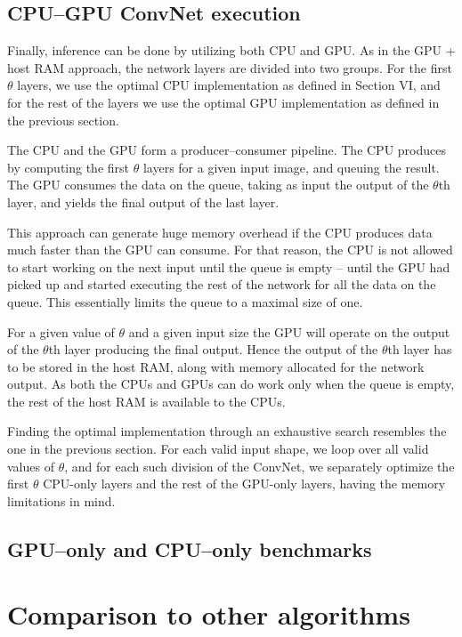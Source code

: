 \documentclass[conference]{./IEEEtran/IEEEtran}
\begin{document}
\subsection{CPU--GPU ConvNet execution}
Finally, inference can be done by utilizing both CPU and GPU.  As in
the GPU + host RAM approach, the network
  layers are divided into two groups.  For the first $\theta$
  layers, we use the optimal CPU implementation as defined in Section
  VI, and for the rest of the layers we use the optimal GPU
  implementation as defined in the previous section.

  The CPU and the GPU form a producer--consumer pipeline.  The CPU
  produces by computing the first $\theta$ layers for a given input
  image, and queuing the result.  The GPU consumes the data on the
  queue, taking as input the output of the $\theta$th layer, and
  yields the final output of the last layer.

  This approach can generate huge memory overhead if the CPU produces
  data much faster than the GPU can consume.  For that reason, the CPU
  is not allowed to start working on the next input until the queue is
  empty -- until the GPU had picked up and started executing the rest
  of the network for all the data on the queue.  This essentially
  limits the queue to a maximal size of one.

  For a given value of $\theta$ and a given input size the GPU will
  operate on the output of the $\theta$th layer producing the final
  output.  Hence the output of the $\theta$th layer has to be stored
  in the host RAM, along with memory allocated for the network output.
  As both the CPUs and GPUs can do work only when the queue is empty,
  the rest of the host RAM is available to the CPUs.

  Finding the optimal implementation through an exhaustive search
  resembles the one in the previous section.  For each valid input
  shape, we loop over all valid values of $\theta$, and for each such
  division of the ConvNet, we separately optimize the first $\theta$
  CPU-only layers and the rest of the GPU-only layers, having the
  memory limitations in mind.

\subsection{GPU--only and CPU--only benchmarks}



\section{Comparison to other algorithms}
\end{document}
